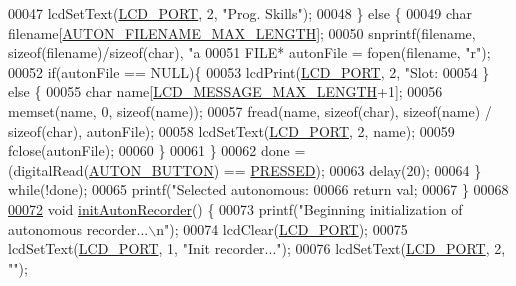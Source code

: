 \begin{DoxyCode}
00047             lcdSetText(\hyperlink{lcdmsg_8h_abcf42bd88b3c36193f301ca25b033875}{LCD\_PORT}, 2, \textcolor{stringliteral}{"Prog. Skills"});
00048         \} \textcolor{keywordflow}{else} \{
00049             \textcolor{keywordtype}{char} filename[\hyperlink{autonrecorder_8h_a9411d1482daa18dd8221c30db7fc6e4e}{AUTON\_FILENAME\_MAX\_LENGTH}];
00050             snprintf(filename, \textcolor{keyword}{sizeof}(filename)/\textcolor{keyword}{sizeof}(\textcolor{keywordtype}{char}), \textcolor{stringliteral}{"a%
00051             FILE* autonFile = fopen(filename, \textcolor{stringliteral}{"r"});
00052             \textcolor{keywordflow}{if}(autonFile == NULL)\{
00053                 lcdPrint(\hyperlink{lcdmsg_8h_abcf42bd88b3c36193f301ca25b033875}{LCD\_PORT}, 2, \textcolor{stringliteral}{"Slot: %
00054             \} \textcolor{keywordflow}{else} \{
00055                 \textcolor{keywordtype}{char} name[\hyperlink{lcdmsg_8h_abe4c4b70fc6f44ae3680e5b2c68cdd00}{LCD\_MESSAGE\_MAX\_LENGTH}+1];
00056                 memset(name, 0, \textcolor{keyword}{sizeof}(name));
00057                 fread(name, \textcolor{keyword}{sizeof}(\textcolor{keywordtype}{char}), \textcolor{keyword}{sizeof}(name) / \textcolor{keyword}{sizeof}(\textcolor{keywordtype}{char}), autonFile);
00058                 lcdSetText(\hyperlink{lcdmsg_8h_abcf42bd88b3c36193f301ca25b033875}{LCD\_PORT}, 2, name);
00059                 fclose(autonFile);
00060             \}
00061         \}
00062         done = (digitalRead(\hyperlink{autonrecorder_8h_a5e5e9512ca0c5f741113ae51b24258c1}{AUTON\_BUTTON}) == \hyperlink{friendly_8h_a654adff3c664f27f0b29c24af818dd26}{PRESSED});
00063         delay(20);
00064     \} \textcolor{keywordflow}{while}(!done);
00065     printf(\textcolor{stringliteral}{"Selected autonomous: %
00066     \textcolor{keywordflow}{return} val;
00067 \}
00068 
\hypertarget{autonrecorder_8c_source.tex_l00072}{}\hyperlink{autonrecorder_8h_acd89c8b2c622ae271c5d63d7fb8fa5f6}{00072} \textcolor{keywordtype}{void} \hyperlink{autonrecorder_8c_acd89c8b2c622ae271c5d63d7fb8fa5f6}{initAutonRecorder}() \{
00073     printf(\textcolor{stringliteral}{"Beginning initialization of autonomous recorder...\(\backslash\)n"});
00074     lcdClear(\hyperlink{lcdmsg_8h_abcf42bd88b3c36193f301ca25b033875}{LCD\_PORT});
00075     lcdSetText(\hyperlink{lcdmsg_8h_abcf42bd88b3c36193f301ca25b033875}{LCD\_PORT}, 1, \textcolor{stringliteral}{"Init recorder..."});
00076     lcdSetText(\hyperlink{lcdmsg_8h_abcf42bd88b3c36193f301ca25b033875}{LCD\_PORT}, 2, \textcolor{stringliteral}{""});
}}}
\end{DoxyCode}
